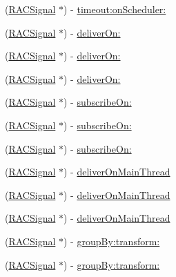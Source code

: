 \begin{DoxyCompactItemize}
(\mbox{\hyperlink{interface_r_a_c_signal}{R\+A\+C\+Signal}} $\ast$) -\/ \mbox{\hyperlink{interface_r_a_c_signal_a8c5f03f4cc8a132e91a985f3d5ccebc0}{timeout\+:on\+Scheduler\+:}}
\item 
(\mbox{\hyperlink{interface_r_a_c_signal}{R\+A\+C\+Signal}} $\ast$) -\/ \mbox{\hyperlink{interface_r_a_c_signal_a69e4dc1c476da42ed829caed84fbd258}{deliver\+On\+:}}
\item 
(\mbox{\hyperlink{interface_r_a_c_signal}{R\+A\+C\+Signal}} $\ast$) -\/ \mbox{\hyperlink{interface_r_a_c_signal_a69e4dc1c476da42ed829caed84fbd258}{deliver\+On\+:}}
\item 
(\mbox{\hyperlink{interface_r_a_c_signal}{R\+A\+C\+Signal}} $\ast$) -\/ \mbox{\hyperlink{interface_r_a_c_signal_a69e4dc1c476da42ed829caed84fbd258}{deliver\+On\+:}}
\item 
(\mbox{\hyperlink{interface_r_a_c_signal}{R\+A\+C\+Signal}} $\ast$) -\/ \mbox{\hyperlink{interface_r_a_c_signal_a6b8db542f7106880577a943cb8e9da90}{subscribe\+On\+:}}
\item 
(\mbox{\hyperlink{interface_r_a_c_signal}{R\+A\+C\+Signal}} $\ast$) -\/ \mbox{\hyperlink{interface_r_a_c_signal_a6b8db542f7106880577a943cb8e9da90}{subscribe\+On\+:}}
\item 
(\mbox{\hyperlink{interface_r_a_c_signal}{R\+A\+C\+Signal}} $\ast$) -\/ \mbox{\hyperlink{interface_r_a_c_signal_a6b8db542f7106880577a943cb8e9da90}{subscribe\+On\+:}}
\item 
(\mbox{\hyperlink{interface_r_a_c_signal}{R\+A\+C\+Signal}} $\ast$) -\/ \mbox{\hyperlink{interface_r_a_c_signal_a0c7042ce0eb6c729bc38421295296db1}{deliver\+On\+Main\+Thread}}
\item 
(\mbox{\hyperlink{interface_r_a_c_signal}{R\+A\+C\+Signal}} $\ast$) -\/ \mbox{\hyperlink{interface_r_a_c_signal_a0c7042ce0eb6c729bc38421295296db1}{deliver\+On\+Main\+Thread}}
\item 
(\mbox{\hyperlink{interface_r_a_c_signal}{R\+A\+C\+Signal}} $\ast$) -\/ \mbox{\hyperlink{interface_r_a_c_signal_a0c7042ce0eb6c729bc38421295296db1}{deliver\+On\+Main\+Thread}}
\item 
(\mbox{\hyperlink{interface_r_a_c_signal}{R\+A\+C\+Signal}} $\ast$) -\/ \mbox{\hyperlink{interface_r_a_c_signal_ad04cf174e24905df96f211b60e31a3cd}{group\+By\+:transform\+:}}
\item 
(\mbox{\hyperlink{interface_r_a_c_signal}{R\+A\+C\+Signal}} $\ast$) -\/ \mbox{\hyperlink{interface_r_a_c_signal_ad04cf174e24905df96f211b60e31a3cd}{group\+By\+:transform\+:}}
\item 

\end{DoxyCompactItemize}
